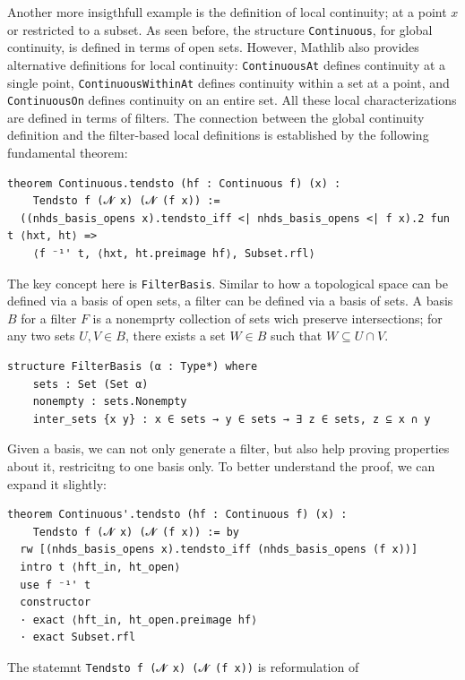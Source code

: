 \begin{example}
    Another more insigthfull example is the definition of local continuity;
    at a point $x$ or restricted to a subset.
    As seen before, the structure \lstinline[language=lean]|Continuous|,
    for global continuity, is defined
    in terms of open sets. However, Mathlib
    also provides alternative definitions
    for local continuity: \lstinline[language=lean]|ContinuousAt|
    defines continuity at a single point,
    \lstinline[language=lean]|ContinuousWithinAt| defines continuity within a
    set at a point, and
    \lstinline[language=lean]|ContinuousOn| defines continuity on an entire set.
    All these local characterizations are defined in terms of filters.
    The connection between the global continuity definition and the filter-based
    local definitions is established by the following fundamental theorem:
    \begin{lstlisting}[language=lean]
theorem Continuous.tendsto (hf : Continuous f) (x) : 
    Tendsto f (𝓝 x) (𝓝 (f x)) :=
  ((nhds_basis_opens x).tendsto_iff <| nhds_basis_opens <| f x).2 fun t ⟨hxt, ht⟩ =>
    ⟨f ⁻¹' t, ⟨hxt, ht.preimage hf⟩, Subset.rfl⟩
\end{lstlisting}
    The key concept here is \lstinline[language=lean]|FilterBasis|.
    Similar to how a topological space can be defined via a basis of open sets,
    a filter can be defined via a basis of sets.
    A basis  $B$ for a filter $F$ is a nonemprty collection of sets wich
    preserve intersections;
    for any two sets $U, V \in B$, there exists a set $W \in B$ such
    that $W \subseteq U \cap V$.
    \begin{lstlisting}[language=lean]
  structure FilterBasis (α : Type*) where
    sets : Set (Set α)
    nonempty : sets.Nonempty
    inter_sets {x y} : x ∈ sets → y ∈ sets → ∃ z ∈ sets, z ⊆ x ∩ y
  \end{lstlisting}
    Given a basis, we can not only generate a filter,
    but also help proving properties about it, restricitng to one basis only.
    \newpage
    To better understand the proof, we can expand it slightly:
    \begin{lstlisting}[language=lean]
theorem Continuous'.tendsto (hf : Continuous f) (x) :
    Tendsto f (𝓝 x) (𝓝 (f x)) := by
  rw [(nhds_basis_opens x).tendsto_iff (nhds_basis_opens (f x))]
  intro t ⟨hft_in, ht_open⟩
  use f ⁻¹' t
  constructor
  · exact ⟨hft_in, ht_open.preimage hf⟩
  · exact Subset.rfl
\end{lstlisting}
    The statemnt \lstinline[language=lean]|Tendsto f (𝓝 x) (𝓝 (f x))| is reformulation of

\end{example}
